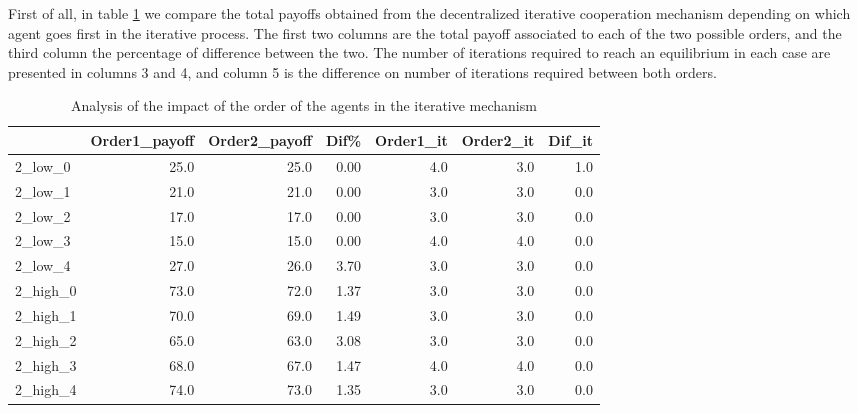 \documentclass[authoryear]{elsarticle}
\begin{document}
First of all, in table \ref{tb:iter_order_comparition} we compare the total payoffs obtained from the decentralized iterative cooperation mechanism depending on which agent goes first in the iterative process. The first two columns are the total payoff associated to each of the two possible orders, and the third column the percentage of difference between the two. The number of iterations required to reach an equilibrium in each case are presented in columns 3 and 4, and column 5 is the difference on number of iterations required between both orders.



\begin{table}[ht!]
\centering
\caption{Analysis of the impact of the order of the agents in the iterative mechanism \label{tb:iter_order_comparition}}
\begin{adjustbox}{max width=\textwidth}
\begin{tabular}{lrrrrrr}
\toprule
{} &  Order1\_payoff &  Order2\_payoff &      Dif\% &  Order1\_it &  Order2\_it &  Dif\_it \\
\midrule
2\_low\_0  &           25.0 &           25.0 &  0.00 &        4.0 &        3.0 &     1.0 \\
2\_low\_1  &           21.0 &           21.0 &  0.00 &        3.0 &        3.0 &     0.0 \\
2\_low\_2  &           17.0 &           17.0 &  0.00 &        3.0 &        3.0 &     0.0 \\
2\_low\_3  &           15.0 &           15.0 &  0.00 &        4.0 &        4.0 &     0.0 \\
2\_low\_4  &           27.0 &           26.0 &  3.70 &        3.0 &        3.0 &     0.0 \\
2\_high\_0 &           73.0 &           72.0 &  1.37 &        3.0 &        3.0 &     0.0 \\
2\_high\_1 &           70.0 &           69.0 &  1.49 &        3.0 &        3.0 &     0.0 \\
2\_high\_2 &           65.0 &           63.0 &  3.08 &        3.0 &        3.0 &     0.0 \\
2\_high\_3 &           68.0 &           67.0 &  1.47 &        4.0 &        4.0 &     0.0 \\
2\_high\_4 &           74.0 &           73.0 &  1.35 &        3.0 &        3.0 &     0.0 \\
\bottomrule
\end{tabular}
\end{adjustbox}
\end{table}
\end{document}
